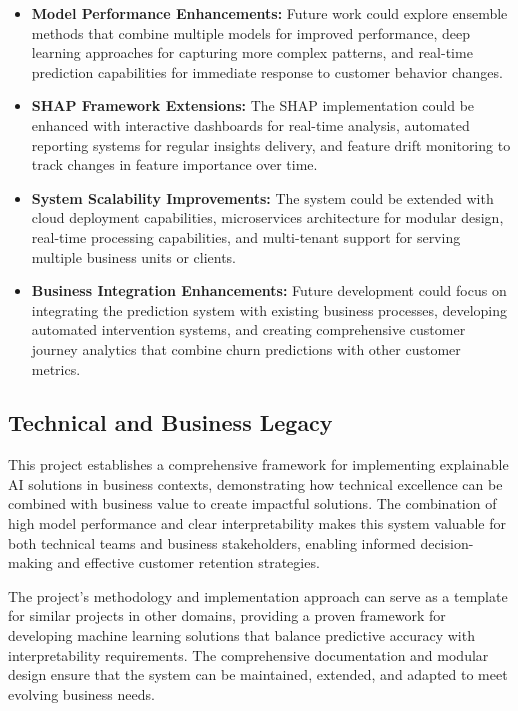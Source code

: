 \documentclass{article}
\begin{document}
\begin{itemize}
    \item \textbf{Model Performance Enhancements:} Future work could explore ensemble methods that combine multiple models for improved performance, deep learning approaches for capturing more complex patterns, and real-time prediction capabilities for immediate response to customer behavior changes.
    
    \item \textbf{SHAP Framework Extensions:} The SHAP implementation could be enhanced with interactive dashboards for real-time analysis, automated reporting systems for regular insights delivery, and feature drift monitoring to track changes in feature importance over time.
    
    \item \textbf{System Scalability Improvements:} The system could be extended with cloud deployment capabilities, microservices architecture for modular design, real-time processing capabilities, and multi-tenant support for serving multiple business units or clients.
    
    \item \textbf{Business Integration Enhancements:} Future development could focus on integrating the prediction system with existing business processes, developing automated intervention systems, and creating comprehensive customer journey analytics that combine churn predictions with other customer metrics.
\end{itemize}

\subsection{Technical and Business Legacy}

This project establishes a comprehensive framework for implementing explainable AI solutions in business contexts, demonstrating how technical excellence can be combined with business value to create impactful solutions. The combination of high model performance and clear interpretability makes this system valuable for both technical teams and business stakeholders, enabling informed decision-making and effective customer retention strategies.

The project's methodology and implementation approach can serve as a template for similar projects in other domains, providing a proven framework for developing machine learning solutions that balance predictive accuracy with interpretability requirements. The comprehensive documentation and modular design ensure that the system can be maintained, extended, and adapted to meet evolving business needs.
\end{document}
